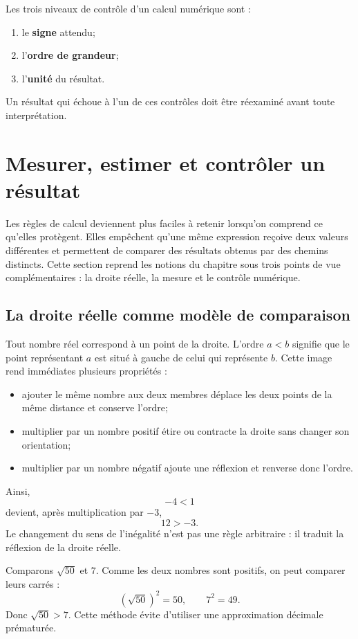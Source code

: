\documentclass[12pt,a4paper,openany]{book}
\begin{document}
\begin{visualbox}
Les trois niveaux de contrôle d'un calcul numérique sont :
\begin{enumerate}
\item le \textbf{signe} attendu;
\item l'\textbf{ordre de grandeur};
\item l'\textbf{unité} du résultat.
\end{enumerate}
Un résultat qui échoue à l'un de ces contrôles doit être réexaminé avant toute interprétation.
\end{visualbox}


\section{Mesurer, estimer et contrôler un résultat}

Les règles de calcul deviennent plus faciles à retenir lorsqu'on comprend ce qu'elles protègent. Elles empêchent qu'une même expression reçoive deux valeurs différentes et permettent de comparer des résultats obtenus par des chemins distincts. Cette section reprend les notions du chapitre sous trois points de vue complémentaires : la droite réelle, la mesure et le contrôle numérique.

\subsection{La droite réelle comme modèle de comparaison}

Tout nombre réel correspond à un point de la droite. L'ordre $a<b$ signifie que le point représentant $a$ est situé à gauche de celui qui représente $b$. Cette image rend immédiates plusieurs propriétés :
\begin{itemize}
\item ajouter le même nombre aux deux membres déplace les deux points de la même distance et conserve l'ordre;
\item multiplier par un nombre positif étire ou contracte la droite sans changer son orientation;
\item multiplier par un nombre négatif ajoute une réflexion et renverse donc l'ordre.
\end{itemize}

Ainsi,
\[
-4<1
\]
devient, après multiplication par $-3$,
\[
12>-3.
\]
Le changement du sens de l'inégalité n'est pas une règle arbitraire : il traduit la réflexion de la droite réelle.

\begin{examplebox}
Comparons $\sqrt{50}$ et $7$. Comme les deux nombres sont positifs, on peut comparer leurs carrés :
\[
(\sqrt{50})^2=50,
\qquad
7^2=49.
\]
Donc $\sqrt{50}>7$. Cette méthode évite d'utiliser une approximation décimale prématurée.
\end{examplebox}
\end{document}
